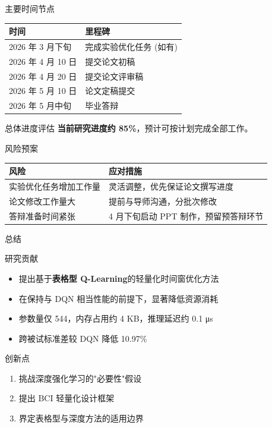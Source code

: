 \documentclass[aspectratio=169, 10pt]{beamer}
\begin{document}
\begin{frame}{主要时间节点}
\begin{table}
\centering
\small
\begin{tabular}{ll}
\toprule
\textbf{时间} & \textbf{里程碑} \\
\midrule
2026 年 3 月下旬 & 完成实验优化任务 (如有) \\
2026 年 4 月 10 日 & 提交论文初稿 \\
2026 年 4 月 20 日 & 提交论文评审稿 \\
2026 年 5 月 10 日 & 论文定稿提交 \\
2026 年 5 月中旬 & 毕业答辩 \\
\bottomrule
\end{tabular}
\end{table}

\vspace{0.5cm}
\begin{block}{总体进度评估}
\textbf{当前研究进度约 85\%}，预计可按计划完成全部工作。
\end{block}
\end{frame}

\begin{frame}{风险预案}
\begin{table}
\centering
\small
\begin{tabular}{ll}
\toprule
\textbf{风险} & \textbf{应对措施} \\
\midrule
实验优化任务增加工作量 & 灵活调整，优先保证论文撰写进度 \\
论文修改工作量大 & 提前与导师沟通，分批次修改 \\
答辩准备时间紧张 & 4 月下旬启动 PPT 制作，预留预答辩环节 \\
\bottomrule
\end{tabular}
\end{table}
\end{frame}

\begin{frame}{总结}
\begin{block}{研究贡献}
\begin{itemize}
    \item 提出基于\textbf{表格型 Q-Learning}的轻量化时间窗优化方法
    \item 在保持与 DQN 相当性能的前提下，显著降低资源消耗
    \item 参数量仅 544，内存占用约 4 KB，推理延迟约 0.1 μs
    \item 跨被试标准差较 DQN 降低 10.97\%
\end{itemize}
\end{block}

\vspace{0.3cm}
\begin{block}{创新点}
\begin{enumerate}
    \item 挑战深度强化学习的"必要性"假设
    \item 提出 BCI 轻量化设计框架
    \item 界定表格型与深度方法的适用边界
\end{enumerate}
\end{block}
\end{frame}
\end{document}

